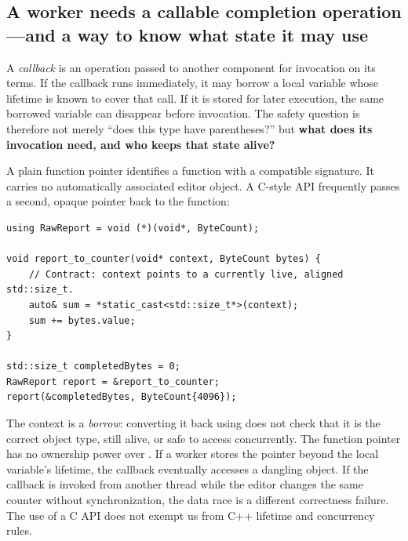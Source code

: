 \subsection{A worker needs a callable completion operation---and a way to know what state it may use}\label{05-engine-i-ch004-a-worker-needs-a-callable-completion-operationand-a-way-to-know-what-state-it-may-use}

\hypertarget{05-engine-i-ch004-a-worker-needs-a-callable-completion-operationand-a-way-to-know-what-state-it-may-use}{}

A \emph{callback} is an operation passed to another component for invocation on its terms. If the callback runs immediately, it may borrow a local variable whose lifetime is known to cover that call. If it is stored for later execution, the same borrowed variable can disappear before invocation. The safety question is therefore not merely ``does this type have parentheses?'' but \textbf{what does its invocation need, and who keeps that state alive?}

A plain function pointer identifies a function with a compatible signature. It carries no automatically associated editor object. A C-style API frequently passes a second, opaque pointer back to the function:

\begin{verbatim}
using RawReport = void (*)(void*, ByteCount);

void report_to_counter(void* context, ByteCount bytes) {
    // Contract: context points to a currently live, aligned std::size_t.
    auto& sum = *static_cast<std::size_t*>(context);
    sum += bytes.value;
}

std::size_t completedBytes = 0;
RawReport report = &report_to_counter;
report(&completedBytes, ByteCount{4096});
\end{verbatim}

The  context is a \emph{borrow}: converting it back using  does not check that it is the correct object type, still alive, or safe to access concurrently. The function pointer has no ownership power over . If a worker stores the pointer beyond the local variable's lifetime, the callback eventually accesses a dangling object. If the callback is invoked from another thread while the editor changes the same counter without synchronization, the data race is a different correctness failure. The use of a C API does not exempt us from C++ lifetime and concurrency rules.

